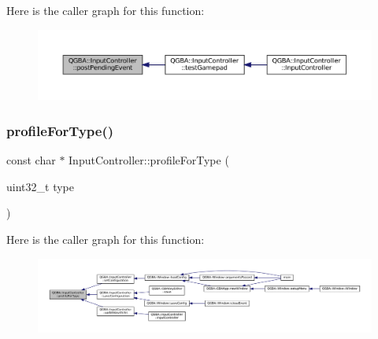 Here is the caller graph for this function\+:
\nopagebreak
\begin{figure}[H]
\begin{center}
\leavevmode
\includegraphics[width=350pt]{class_q_g_b_a_1_1_input_controller_a6a77a32d50689865c44ac9d0f677cda8_icgraph}
\end{center}
\end{figure}
\mbox{\label{class_q_g_b_a_1_1_input_controller_abdbd46077ab5cb86216e3119c3370210}} 
\subsubsection{\texorpdfstring{profile\+For\+Type()}{profileForType()}}
{\footnotesize\ttfamily const char $\ast$ Input\+Controller\+::profile\+For\+Type (\begin{DoxyParamCaption}\item[{uint32\+\_\+t}]{type }\end{DoxyParamCaption})}

Here is the caller graph for this function\+:
\nopagebreak
\begin{figure}[H]
\begin{center}
\leavevmode
\includegraphics[width=350pt]{class_q_g_b_a_1_1_input_controller_abdbd46077ab5cb86216e3119c3370210_icgraph}
\end{center}
\end{figure}
\mbox{\label{class_q_g_b_a_1_1_input_controller_aa71a637cb3965c09bde7ac6e2b562365}} 
